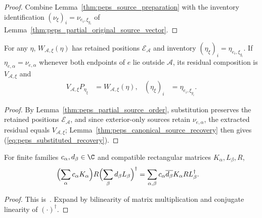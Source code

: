 \begin{proof}
    \leanok
    Combine Lemma~\ref{thm:peps_source_preparation} with the inventory
    identification $(\nu_\xi)_i=\nu_{e_i,\xi_{g_i}}$ of
    Lemma~\ref{thm:peps_partial_original_source_vector}.
\end{proof}

\begin{lemma}
    \label{thm:peps_canonical_substitution_recovery}
    \leanok
    For any $\eta$, $W_{\mathcal A,\xi}(\eta)$ has retained positions
    $\mathcal E_{\mathcal A}$ and inventory $(\eta_\xi)_i=\eta_{e_i,\xi_{g_i}}$.
    If $\eta_{e,\alpha}=\nu_{e,\alpha}$ whenever both endpoints of $e$ lie
    outside $\mathcal A$, its residual composition is $V_{\mathcal A,\xi}$ and
    \begin{align}
        V_{\mathcal A,\xi}P_{\eta_\xi}
         & =W_{\mathcal A,\xi}(\eta),
         & (\eta_\xi)_i               & =\eta_{e_i,\xi_{g_i}}.
        \label{eq:peps_substituted_recovery}
    \end{align}
\end{lemma}

\begin{proof}
    \leanok
    By Lemma~\ref{thm:peps_partial_source_order}, substitution preserves the
    retained positions $\mathcal E_{\mathcal A}$, and since exterior-only
    sources retain $\nu_{e,\alpha}$, the extracted residual equals
    $V_{\mathcal A,\xi}$; Lemma~\ref{thm:peps_canonical_source_recovery} then
    gives (\ref{eq:peps_substituted_recovery}).
\end{proof}

\begin{lemma}
    \label{thm:peps_weighted_density_sum}
    \leanok
    For finite families $c_\alpha,d_\beta\in\C$ and compatible rectangular
    matrices $K_\alpha,L_\beta,R$,
    \begin{align}
        \Bigl(\sum_\alpha c_\alpha K_\alpha\Bigr)R
        \Bigl(\sum_\beta d_\beta L_\beta\Bigr)^\dagger
         & =\sum_{\alpha,\beta}c_\alpha\overline{d_\beta}
        K_\alpha R L_\beta^\dagger.
        \label{eq:peps_weighted_density_sum}
    \end{align}
\end{lemma}
\begin{proof}
    \leanok
    This is~\cite[``Weighted matrix sums'']{QICLean2026Blueprint}.
    Expand by bilinearity of matrix multiplication and conjugate linearity of
    $(\cdot)^\dagger$.
\end{proof}

